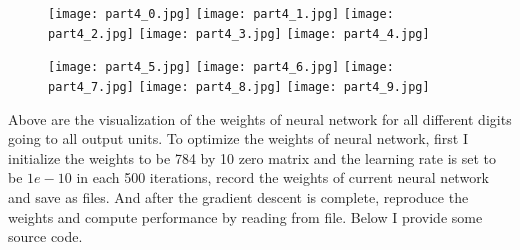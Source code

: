 \documentclass{article}
\begin{document}
\begin{figure}[!htb]
  \texttt{[image: part4\_0.jpg]}
\endminipage\hfill
{}
  \texttt{[image: part4\_1.jpg]}
\endminipage\hfill
{}
  \texttt{[image: part4\_2.jpg]}
\endminipage\hfill
{}
  \texttt{[image: part4\_3.jpg]}
\endminipage\hfill
{}
  \texttt{[image: part4\_4.jpg]}
\endminipage
\end{figure}

\begin{figure}[!htb]
  \texttt{[image: part4\_5.jpg]}
\endminipage\hfill
{}
  \texttt{[image: part4\_6.jpg]}
\endminipage\hfill
{}
  \texttt{[image: part4\_7.jpg]}
\endminipage\hfill
{}
  \texttt{[image: part4\_8.jpg]}
\endminipage\hfill
{}
  \texttt{[image: part4\_9.jpg]}
\endminipage
\end{figure}
\noindent Above are the visualization of the weights of neural network for all different digits going to all output units. To optimize the weights of neural network, first I initialize the weights to be 784 by 10 zero matrix and the learning rate is set to be $1e-10$ in each 500 iterations, record the weights of current neural network and save as files. And after the gradient descent is complete, reproduce the weights and compute performance by reading from file. Below I provide some source code.

\end{document}
